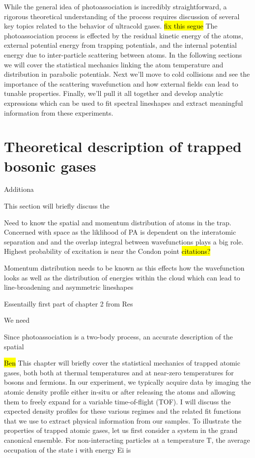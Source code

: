 While the general idea of photoassociation is incredibly straightforward, a rigorous theoretical understanding of the process requires discussion of several key topics related to the behavior of ultracold gases. \hl{fix this segue}
The photoassociation process is effected by the residual kinetic energy of the atoms, external potential energy from trapping potentials, and the internal potential energy due to inter-particle scattering between atoms.
In the following sections we will cover the statistical mechanics linking the atom temperature and distribution in parabolic potentials.
Next we'll move to cold collisions and see the importance of the scattering wavefunction and how external fields can lead to tunable properties.
Finally, we'll pull it all together and develop analytic expressions which can be used to fit spectral lineshapes and extract meaningful information from these experiments.

\section{Theoretical description of trapped bosonic gases} \label{sec:trapped_gases}

Additiona

This section will briefly discuss the 

Need to know the spatial and momentum distribution of atoms in the trap. Concerned with space as the liklihood of PA is dependent on the interatomic separation and and the overlap integral between wavefunctions plays a big role. Highest probability of excitation is near the Condon point \hl{citations?}

Momentum distribution needs to be known as this effects how the wavefunction looks as well as the distribution of energies within the cloud which can lead to line-broadening and asymmetric lineshapes

Essentailly first part of chapter 2 from Res

We need 

Since photoassociation is a two-body process, an accurate description of the spatial

\hl{Ben}
This chapter will briefly cover the statistical mechanics of trapped atomic gases,
both both at thermal temperatures and at near-zero temperatures for bosons and fermions. In our experiment, we typically acquire data by imaging the atomic density profile either in-situ or after releasing the atoms and allowing them to freely expand for a variable time-of-flight (TOF). I will discuss the expected density profiles for these various regimes and the related fit functions that we use to extract physical information from our samples. To illustrate the properties of trapped atomic gases, let us first consider a system
in the grand canonical ensemble. For non-interacting particles at a temperature T, the average occupation of the state i with energy Ei is

